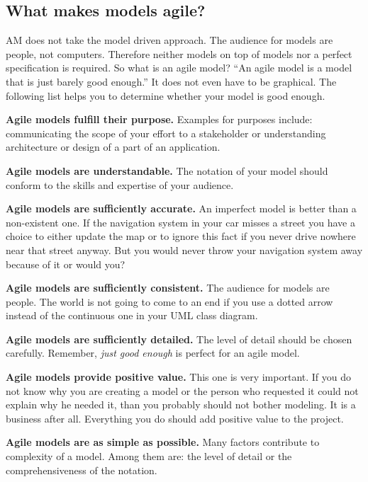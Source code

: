 \subsection{What makes models agile?}
AM does not take the model driven approach. The audience for models are people,
not computers. Therefore neither models on top of models nor a
perfect specification is required. So what is an agile model? \enquote{An agile
model is a model that is just barely good enough.}\cite{Ambler200204} It does
not even have to be graphical. The following list helps you to determine whether
your model is good enough.
\begin{description}
\item {\bf Agile models fulfill their purpose.} Examples for purposes include:
communicating the scope of your effort to a stakeholder or understanding
architecture or design of a part of an application.
\item {\bf Agile models are understandable.} The notation of your model should
conform to the skills and expertise of your audience.
\item {\bf Agile models are sufficiently accurate.} An imperfect model is better
than a non-existent one. If the navigation system in your car misses a street you
have a choice to either update the map or to ignore this fact if you never drive
nowhere near that street anyway. But you would never throw your navigation
system away because of it or would you?
\item {\bf Agile models are sufficiently consistent.} The audience for models
are people. The world is not going to come to an end if you use a dotted arrow
instead of the continuous one in your UML class diagram.
\item {\bf Agile models are sufficiently detailed.} The level of detail should
be chosen carefully. Remember, \emph{just good enough} is perfect for an agile
model.
\item {\bf Agile models provide positive value.} This one is very important. If
you do not know why you are creating a model or the person who requested it could
not explain why he needed it, than you probably should not bother modeling. It
is a business after all. Everything you do should add positive value to the
project.
\item {\bf Agile models are as simple as possible.} Many factors contribute to
complexity of a model. Among them are: the level of detail or
the comprehensiveness of the notation.
\end{description}

